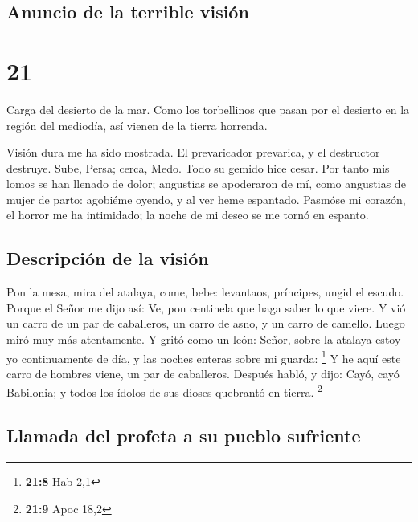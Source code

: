 \hypertarget{anuncio-de-la-terrible-visiuxf3n}{%
\subsection{Anuncio de la terrible
visión}\label{anuncio-de-la-terrible-visiuxf3n}}

\hypertarget{section-20}{%
\section{21}\label{section-20}}

 Carga del desierto de la mar. Como los torbellinos que
pasan por el desierto en la región del mediodía, así vienen de la tierra
horrenda.

 Visión dura me ha sido mostrada. El prevaricador prevarica,
y el destructor destruye. Sube, Persa; cerca, Medo. Todo su gemido hice
cesar.  Por tanto mis lomos se han llenado de dolor;
angustias se apoderaron de mí, como angustias de mujer de parto:
agobiéme oyendo, y al ver heme espantado.  Pasmóse mi
corazón, el horror me ha intimidado; la noche de mi deseo se me tornó en
espanto.

\hypertarget{descripciuxf3n-de-la-visiuxf3n}{%
\subsection{Descripción de la
visión}\label{descripciuxf3n-de-la-visiuxf3n}}

 Pon la mesa, mira del atalaya, come, bebe: levantaos,
príncipes, ungid el escudo.  Porque el Señor me dijo así:
Ve, pon centinela que haga saber lo que viere.  Y vió un
carro de un par de caballeros, un carro de asno, y un carro de camello.
Luego miró muy más atentamente.  Y gritó como un león:
Señor, sobre la atalaya estoy yo continuamente de día, y las noches
enteras sobre mi guarda: \footnote{\textbf{21:8} Hab 2,1}  Y
he aquí este carro de hombres viene, un par de caballeros. Después
habló, y dijo: Cayó, cayó Babilonia; y todos los ídolos de sus dioses
quebrantó en tierra. \footnote{\textbf{21:9} Apoc 18,2}

\hypertarget{llamada-del-profeta-a-su-pueblo-sufriente}{%
\subsection{Llamada del profeta a su pueblo
sufriente}\label{llamada-del-profeta-a-su-pueblo-sufriente}}

